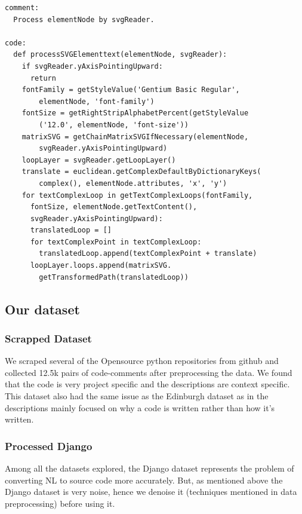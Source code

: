 \documentclass{IEEEtran}
\begin{document}
        \begin{lstlisting}[frame=single,basicstyle=\scriptsize]
comment:
  Process elementNode by svgReader.

code:
  def processSVGElementtext(elementNode, svgReader):
    if svgReader.yAxisPointingUpward:
      return
    fontFamily = getStyleValue('Gentium Basic Regular', 
        elementNode, 'font-family')
    fontSize = getRightStripAlphabetPercent(getStyleValue
        ('12.0', elementNode, 'font-size'))
    matrixSVG = getChainMatrixSVGIfNecessary(elementNode, 
        svgReader.yAxisPointingUpward)
    loopLayer = svgReader.getLoopLayer()
    translate = euclidean.getComplexDefaultByDictionaryKeys(
        complex(), elementNode.attributes, 'x', 'y')
    for textComplexLoop in getTextComplexLoops(fontFamily, 
      fontSize, elementNode.getTextContent(), 
      svgReader.yAxisPointingUpward):
      translatedLoop = []
      for textComplexPoint in textComplexLoop:
        translatedLoop.append(textComplexPoint + translate)
      loopLayer.loops.append(matrixSVG.
        getTransformedPath(translatedLoop))
        \end{lstlisting}

      \subsection{Our dataset}
        \subsubsection{Scrapped Dataset}
        We scraped several of the Opensource python repositories from github and
        collected 12.5k pairs of code-comments after preprocessing the data.
        We found that the code is very project specific and the descriptions are context specific.
        This dataset also had the same issue as the Edinburgh dataset as in the descriptions
        mainly focused on why a code is written rather than how it's written.
        \subsubsection{Processed Django}
        Among all the datasets explored, the Django dataset represents the problem
        of converting NL to source code more accurately. But, as mentioned above
        the Django dataset is very noise, hence we denoise it (techniques
        mentioned in data preprocessing) before using it.

				\smallskip
\end{document}
